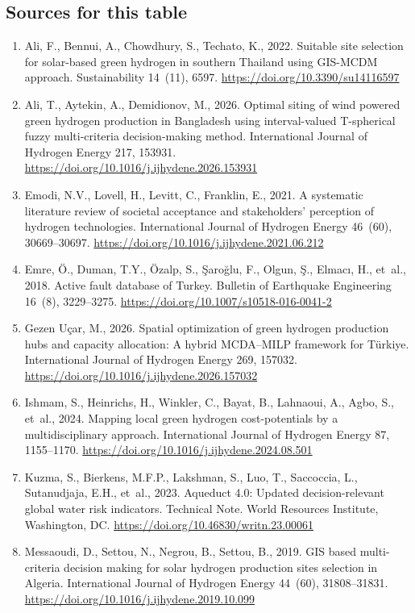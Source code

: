 \documentclass[11pt,a4paper]{article}
\begin{document}
\subsection*{Sources for this table}
\begin{enumerate}\setlength{\itemsep}{0pt}
\item Ali, F., Bennui, A., Chowdhury, S., Techato, K., 2022. Suitable site selection for solar-based green hydrogen in southern Thailand using GIS-MCDM approach. Sustainability 14~(11), 6597. \url{https://doi.org/10.3390/su14116597}
\item Ali, T., Aytekin, A., Demidionov, M., 2026. Optimal siting of wind powered green hydrogen production in Bangladesh using interval-valued T-spherical fuzzy multi-criteria decision-making method. International Journal of Hydrogen Energy 217, 153931. \url{https://doi.org/10.1016/j.ijhydene.2026.153931}
\item Emodi, N.V., Lovell, H., Levitt, C., Franklin, E., 2021. A systematic literature review of societal acceptance and stakeholders' perception of hydrogen technologies. International Journal of Hydrogen Energy 46~(60), 30669--30697. \url{https://doi.org/10.1016/j.ijhydene.2021.06.212}
\item Emre, {\"O}., Duman, T.Y., {\"O}zalp, S., {\c{S}}aro{\u{g}}lu, F., Olgun, {\c{S}}., Elmac{\i}, H., et~al., 2018. Active fault database of Turkey. Bulletin of Earthquake Engineering 16~(8), 3229--3275. \url{https://doi.org/10.1007/s10518-016-0041-2}
\item Gezen U{\c{c}}ar, M., 2026. Spatial optimization of green hydrogen production hubs and capacity allocation: A hybrid MCDA--MILP framework for T{\"u}rkiye. International Journal of Hydrogen Energy 269, 157032. \url{https://doi.org/10.1016/j.ijhydene.2026.157032}
\item Ishmam, S., Heinrichs, H., Winkler, C., Bayat, B., Lahnaoui, A., Agbo, S., et~al., 2024. Mapping local green hydrogen cost-potentials by a multidisciplinary approach. International Journal of Hydrogen Energy 87, 1155--1170. \url{https://doi.org/10.1016/j.ijhydene.2024.08.501}
\item Kuzma, S., Bierkens, M.F.P., Lakshman, S., Luo, T., Saccoccia, L., Sutanudjaja, E.H., et~al., 2023. Aqueduct 4.0: Updated decision-relevant global water risk indicators. Technical Note. World Resources Institute, Washington, DC. \url{https://doi.org/10.46830/writn.23.00061}
\item Messaoudi, D., Settou, N., Negrou, B., Settou, B., 2019. GIS based multi-criteria decision making for solar hydrogen production sites selection in Algeria. International Journal of Hydrogen Energy 44~(60), 31808--31831. \url{https://doi.org/10.1016/j.ijhydene.2019.10.099}

\end{enumerate}
\end{document}
